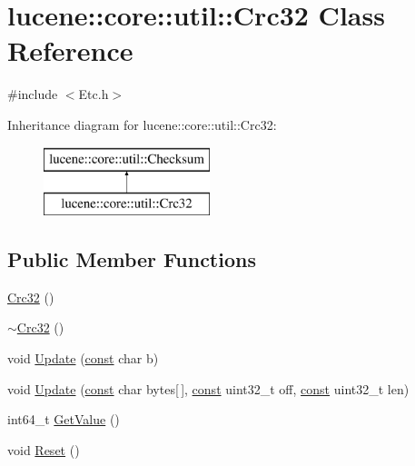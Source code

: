 \hypertarget{classlucene_1_1core_1_1util_1_1Crc32}{}\section{lucene\+:\+:core\+:\+:util\+:\+:Crc32 Class Reference}
\label{classlucene_1_1core_1_1util_1_1Crc32}


{\ttfamily \#include $<$Etc.\+h$>$}

Inheritance diagram for lucene\+:\+:core\+:\+:util\+:\+:Crc32\+:\begin{figure}[H]
\begin{center}
\leavevmode
\includegraphics[height=2.000000cm]{classlucene_1_1core_1_1util_1_1Crc32}
\end{center}
\end{figure}
\subsection*{Public Member Functions}
\begin{DoxyCompactItemize}
\item 
\mbox{\hyperlink{classlucene_1_1core_1_1util_1_1Crc32_a54339ec81ec5ca5cd367eb8154dbe2c5}{Crc32}} ()
\item 
\mbox{\hyperlink{classlucene_1_1core_1_1util_1_1Crc32_afba37e2e4718ddf2b2740261039eaf4b}{$\sim$\+Crc32}} ()
\item 
void \mbox{\hyperlink{classlucene_1_1core_1_1util_1_1Crc32_a2d602ecc736c5cc5a0281bccc032b4fc}{Update}} (\mbox{\hyperlink{ZlibCrc32_8h_a2c212835823e3c54a8ab6d95c652660e}{const}} char b)
\item 
void \mbox{\hyperlink{classlucene_1_1core_1_1util_1_1Crc32_aadb0ec93d3d2097302c869a1f4f61602}{Update}} (\mbox{\hyperlink{ZlibCrc32_8h_a2c212835823e3c54a8ab6d95c652660e}{const}} char bytes\mbox{[}$\,$\mbox{]}, \mbox{\hyperlink{ZlibCrc32_8h_a2c212835823e3c54a8ab6d95c652660e}{const}} uint32\+\_\+t off, \mbox{\hyperlink{ZlibCrc32_8h_a2c212835823e3c54a8ab6d95c652660e}{const}} uint32\+\_\+t len)
\item 
int64\+\_\+t \mbox{\hyperlink{classlucene_1_1core_1_1util_1_1Crc32_a57040a35d56a41c72cc5364ff07d0095}{Get\+Value}} ()
\item 
void \mbox{\hyperlink{classlucene_1_1core_1_1util_1_1Crc32_a4e73914945d7e498799bd444b3fb3b2f}{Reset}} ()
\end{DoxyCompactItemize}
